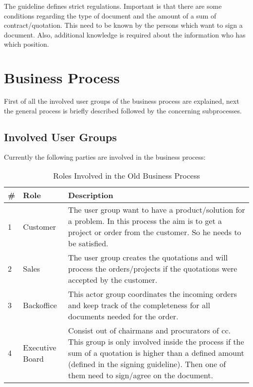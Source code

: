 The guideline defines strict regulations. Important is that there are some conditions regarding the type of document and the amount of a sum of contract/quotation. This need to be known by the persons which want to sign a document. Also, additional knowledge is required about the information who has which position.

\section{Business Process} \label{sec:bp}
First of all the involved user groups of the business process are explained, next the general process is briefly described followed by the concerning subprocesses.

\subsection*{Involved User Groups}
Currently the following parties are involved in the business process: 
\begin{table}[h]
	\begin{tabular}{|p{0.25cm}|p{2cm}|p{14cm}|} \hline
		\rowcolor{Gray}\# & Role & Description \\ \hline
		1 & Customer & The user group want to have a product/solution for a problem. In this process the aim is to get a project or order from the customer. So he needs to be satisfied. \\ \hline
		2 & Sales & The user group creates the quotations and will process the orders/projects if the quotations were accepted by the customer. \\ \hline
		3 & Backoffice & This actor group coordinates the incoming orders and keep track of the completeness for all documents needed for the order. \\ \hline
		4 & Executive Board & Consist out of chairmans and procurators of \gls{cc}. This group is only involved inside the process if the sum of a quotation is higher than a defined amount (defined in the signing guideline). Then one of them need to sign/agree on the document. \\ \hline
	\end{tabular}
	\caption{Roles Involved in the Old Business Process}
	\label{tab:bpRoles}
\end{table}

